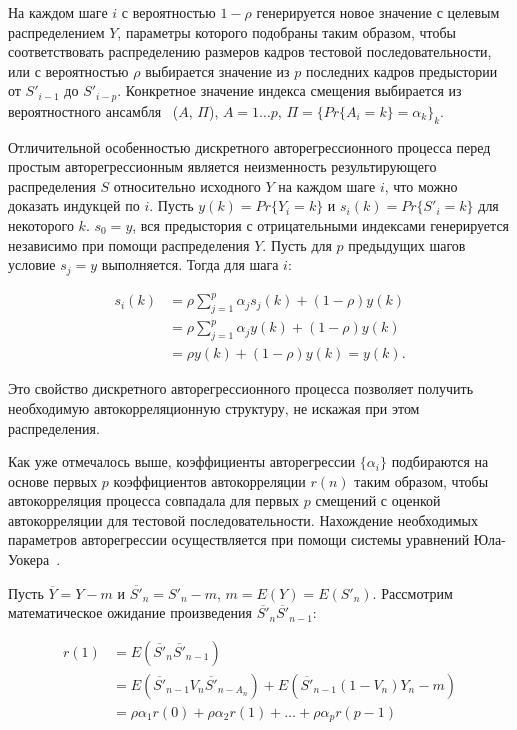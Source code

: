 На каждом шаге $i$ с вероятностью $1 - \rho$ генерируется новое значение с целевым
распределением $Y$, параметры которого подобраны таким образом, чтобы
соответствовать распределению размеров кадров тестовой последовательности,
или с вероятностью $\rho$ выбирается значение из $p$ последних кадров предыстории
от $S'_{i-1}$ до $S'_{i-p}$. Конкретное значение индекса смещения выбирается
из вероятностного ансамбля~\cite{shannon} ($A$, $\Pi$), $A = {1 \dots p}$,
$\Pi = \{Pr\{A_i = k\} = \alpha_k\}_k$.

Отличительной особенностью дискретного авторегрессионного процесса
перед простым авторегрессионным является неизменность результирующего
распределения $S$ относительно исходного $Y$ на каждом шаге $i$, что можно доказать индукцей по $i$.
Пусть $y(k) = Pr\{Y_i = k\}$ и $s_i(k) = Pr\{S'_i = k\}$ для некоторого $k$.
$s_0 = y$, вся предыстория с отрицательными индексами генерируется
независимо при помощи распределения $Y$. Пусть для $p$ предыдущих шагов
условие $s_{j} = y$ выполняется. Тогда для шага $i$:

\begin{equation}
    \begin{aligned}
        s_i(k) &= \rho \sum_{j=1}^p \alpha_j s_j(k) + (1 - \rho)y(k) \\
               &= \rho \sum_{j=1}^p \alpha_j y(k) + (1 - \rho)y(k) \\
               &= \rho y(k) + (1 - \rho)y(k) = y(k).
    \end{aligned}
\end{equation}

Это свойство дискретного авторегрессионного процесса позволяет получить
необходимую автокорреляционную структуру, не искажая при этом
распределения.

Как уже отмечалось выше, коэффициенты авторегрессии $\{\alpha_i\}$
подбираются на основе первых $p$ коэффициентов автокорреляции $r(n)$  таким
образом, чтобы автокорреляция процесса совпадала для первых $p$ смещений
с оценкой автокорреляции для тестовой последовательности. Нахождение
необходимых параметров авторегрессии осуществляется при помощи системы
уравнений Юла-Уокера~\cite{mixtures}.

Пусть $\overline{Y} = Y - m$ и $\overline{S'}_n = S'_n - m$, $m = E(Y) = E(S'_n)$.
Рассмотрим математическое ожидание произведения $\overline{S'}_n\overline{S'}_{n-1}$:

\begin{equation}
    \begin{aligned}
        r(1) &= E(\overline{S'}_n \overline{S'}_{n-1}) \\
             &= E(\overline{S'}_{n-1} V_n \overline{S'}_{n - A_n}) + E(\overline{S'}_{n-1} (1 - V_n) Y_n - m) \\
             &= \rho\alpha_1 r(0) + \rho\alpha_2 r(1) + \dots + \rho\alpha_p r(p - 1) \\
    \end{aligned}
\end{equation}

